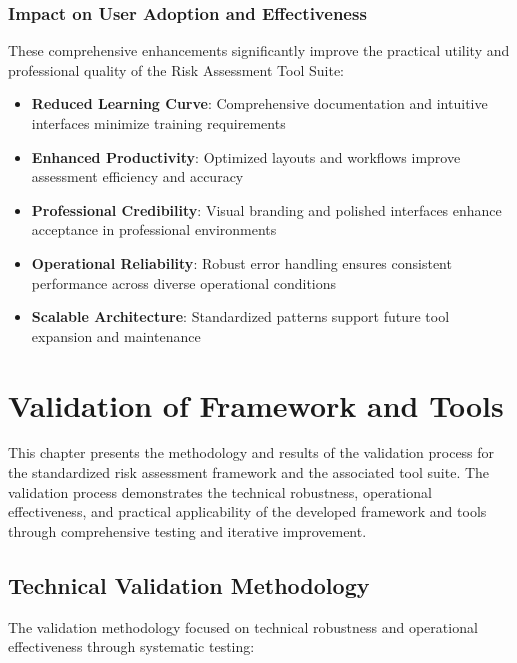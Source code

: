 \documentclass[binding=0.6cm]{sapthesis}
\begin{document}
\subsection{Impact on User Adoption and Effectiveness}

These comprehensive enhancements significantly improve the practical utility and professional quality of the Risk Assessment Tool Suite:

\begin{itemize}
    \item \textbf{Reduced Learning Curve}: Comprehensive documentation and intuitive interfaces minimize training requirements
    \item \textbf{Enhanced Productivity}: Optimized layouts and workflows improve assessment efficiency and accuracy
    \item \textbf{Professional Credibility}: Visual branding and polished interfaces enhance acceptance in professional environments
    \item \textbf{Operational Reliability}: Robust error handling ensures consistent performance across diverse operational conditions
    \item \textbf{Scalable Architecture}: Standardized patterns support future tool expansion and maintenance
\end{itemize}

\chapter{Validation of Framework and Tools}
\label{ch:validation}

This chapter presents the methodology and results of the validation process for the standardized risk assessment framework and the associated tool suite. The validation process demonstrates the technical robustness, operational effectiveness, and practical applicability of the developed framework and tools through comprehensive testing and iterative improvement.

\section{Technical Validation Methodology}

The validation methodology focused on technical robustness and operational effectiveness through systematic testing:
\end{document}

